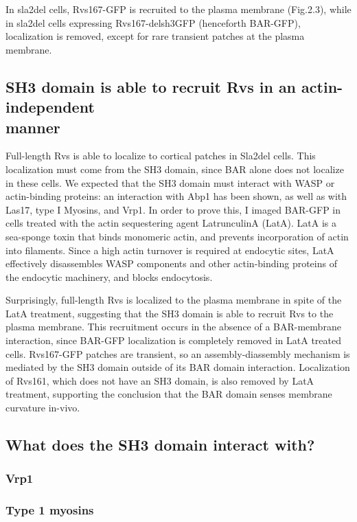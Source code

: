 	\vspace{5mm}
	In sla2del cells, Rvs167-GFP is recruited to the plasma membrane (Fig.2.3), while in sla2del cells expressing Rvs167-delsh3GFP (henceforth BAR-GFP), localization is removed, except for rare transient patches at the plasma membrane. 

	
	\subsection{SH3 domain is able to recruit Rvs in an
		actin-independent  	\\ manner}
	Full-length Rvs is able to localize to cortical patches in Sla2del cells. This localization must come from the SH3 domain, since BAR alone does not localize in these cells. We expected that the SH3 domain must interact with WASP or actin-binding proteins: an interaction with Abp1 has been shown, as well as with Las17, type I Myosins, and Vrp1. In order to prove this, I imaged BAR-GFP in cells treated with the actin sequestering agent LatrunculinA (LatA). LatA is a sea-sponge toxin that binds monomeric actin, and prevents incorporation of actin into filaments. Since a high actin turnover is required at endocytic sites, LatA effectively disassembles WASP components and other actin-binding proteins of the endocytic machinery, and blocks endocytosis. 
	
	\vspace{5mm}
	Surprisingly, full-length Rvs is localized to the plasma membrane in spite of the LatA treatment, suggesting that the SH3 domain is able to recruit Rvs to the plasma membrane. This recruitment occurs in the absence of a BAR-membrane interaction, since BAR-GFP localization is completely removed in LatA treated cells. Rvs167-GFP patches are transient, so an assembly-diassembly mechanism is mediated by the SH3 domain outside of its BAR domain interaction. Localization of Rvs161, which does not have an SH3 domain, is also removed by LatA treatment, supporting the conclusion that the BAR domain senses membrane curvature in-vivo. 

	\subsection{What does the SH3 domain interact with?}
		\subsubsection{Vrp1}
		\subsubsection{Type 1 myosins}
